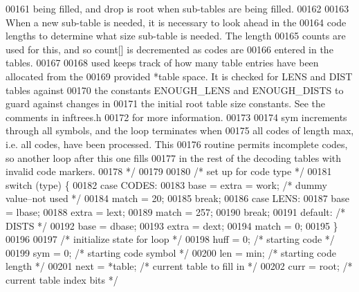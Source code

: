 \begin{DoxyCode}
00161 \textcolor{comment}{       being filled, and drop is root when sub-tables are being filled.}
00162 \textcolor{comment}{}
00163 \textcolor{comment}{       When a new sub-table is needed, it is necessary to look ahead in the}
00164 \textcolor{comment}{       code lengths to determine what size sub-table is needed.  The length}
00165 \textcolor{comment}{       counts are used for this, and so count[] is decremented as codes are}
00166 \textcolor{comment}{       entered in the tables.}
00167 \textcolor{comment}{}
00168 \textcolor{comment}{       used keeps track of how many table entries have been allocated from the}
00169 \textcolor{comment}{       provided *table space.  It is checked for LENS and DIST tables against}
00170 \textcolor{comment}{       the constants ENOUGH\_LENS and ENOUGH\_DISTS to guard against changes in}
00171 \textcolor{comment}{       the initial root table size constants.  See the comments in inftrees.h}
00172 \textcolor{comment}{       for more information.}
00173 \textcolor{comment}{}
00174 \textcolor{comment}{       sym increments through all symbols, and the loop terminates when}
00175 \textcolor{comment}{       all codes of length max, i.e. all codes, have been processed.  This}
00176 \textcolor{comment}{       routine permits incomplete codes, so another loop after this one fills}
00177 \textcolor{comment}{       in the rest of the decoding tables with invalid code markers.}
00178 \textcolor{comment}{     */}
00179 
00180     \textcolor{comment}{/* set up for code type */}
00181     \textcolor{keywordflow}{switch} (type) \{
00182     \textcolor{keywordflow}{case} CODES:
00183         base = extra = work;    \textcolor{comment}{/* dummy value--not used */}
00184         match = 20;
00185         \textcolor{keywordflow}{break};
00186     \textcolor{keywordflow}{case} LENS:
00187         base = lbase;
00188         extra = lext;
00189         match = 257;
00190         \textcolor{keywordflow}{break};
00191     \textcolor{keywordflow}{default}:    \textcolor{comment}{/* DISTS */}
00192         base = dbase;
00193         extra = dext;
00194         match = 0;
00195     \}
00196 
00197     \textcolor{comment}{/* initialize state for loop */}
00198     huff = 0;                   \textcolor{comment}{/* starting code */}
00199     sym = 0;                    \textcolor{comment}{/* starting code symbol */}
00200     len = min;                  \textcolor{comment}{/* starting code length */}
00201     next = *table;              \textcolor{comment}{/* current table to fill in */}
00202     curr = root;                \textcolor{comment}{/* current table index bits */}

\end{DoxyCode}
